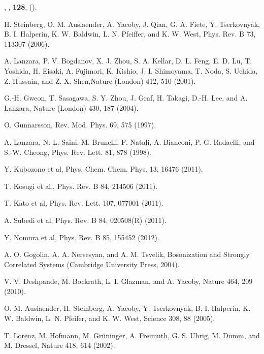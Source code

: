 \documentclass[article,11pt]{revtex4}
\begin{document}
\begin{thebibliography}{199}
, 
  ,
   \textbf{128},
   ().

 H. Steinberg, O. M. Auslaender, A. Yacoby, J. Qian, G. A. Fiete, Y. Tserkovnyak, B. I. Halperin, K. W. Baldwin, L. N. Pfeiffer, and K. W. West, Phys. Rev. B 73, 113307 (2006).

 A. Lanzara, P. V. Bogdanov, X. J. Zhou, S. A. Kellar, D. L.
Feng, E. D. Lu, T. Yoshida, H. Eisaki, A. Fujimori, K. Kishio, J.
I. Shimoyama, T. Noda, S. Uchida, Z. Hussain, and Z. X.
Shen,Nature (London) 412, 510 (2001).

 G.-H. Gweon, T. Sasagawa, S. Y. Zhou, J. Graf, H.
Takagi, D.-H. Lee, and A. Lanzara, Nature (London) 430, 187
(2004).

 O. Gunnarsson, Rev. Mod. Phys. 69, 575 (1997).

 A. Lanzara, N. L. Saini, M. Brunelli, F. Natali, A. Bianconi,
P. G. Radaelli, and S.-W. Cheong, Phys. Rev. Lett. 81, 878 (1998).

 Y. Kubozono et al, Phys. Chem. Chem. Phys. 13, 16476 (2011).

 T. Kosugi et al., Phys. Rev. B 84, 214506 (2011). 

 T. Kato et al, Phys. Rev. Lett. 107, 077001 (2011).

 A. Subedi et al, Phys. Rev. B 84, 020508(R) (2011).

 Y. Nomura et al, Phys. Rev. B 85, 155452 (2012).

 A. O. Gogolin, A. A. Nersesyan, and A. M. Tsvelik, Bosonization
and Strongly Correlated Systems (Cambridge University Press,
2004).

 V. V. Deshpande, M. Bockrath, L. I. Glazman, and A. Yacoby,
Nature 464, 209 (2010).

 O. M. Auslaender, H. Steinberg, A. Yacoby, Y. Tserkovnyak, B.
I. Halperin, K. W. Baldwin, L. N. Pfeifer, and K. W. West, Science
308, 88 (2005).

 T. Lorenz, M. Hofmann, M. Gr\"uninger, A. Freimuth, G. S. Uhrig,
M. Dumm, and M. Dressel, Nature 418, 614 (2002).


\end{thebibliography}
\end{document}
